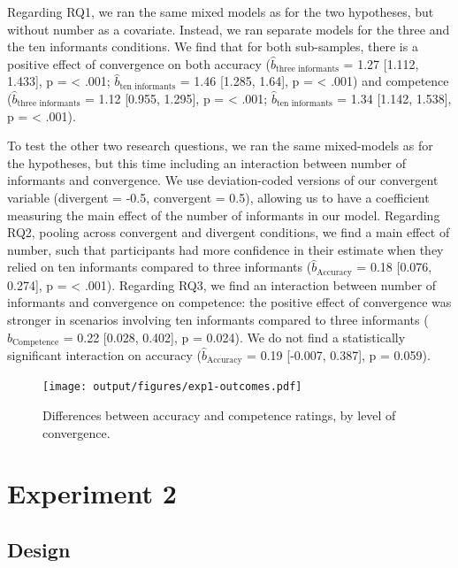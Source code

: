 \documentclass[
  doc,floatsintext]{apa6}
\begin{document}
Regarding RQ1, we ran the same mixed models as for the two hypotheses, but without number as a covariate. Instead, we ran separate models for the three and the ten informants conditions. We find that for both sub-samples, there is a positive effect of convergence on both accuracy (\(\hat{b}_{\text{three informants}}\) = 1.27 {[}1.112, 1.433{]}, p = \textless{} .001; \(\hat{b}_{\text{ten informants}}\) = 1.46 {[}1.285, 1.64{]}, p = \textless{} .001) and competence (\(\hat{b}_{\text{three informants}}\) = 1.12 {[}0.955, 1.295{]}, p = \textless{} .001; \(\hat{b}_{\text{ten informants}}\) = 1.34 {[}1.142, 1.538{]}, p = \textless{} .001).

To test the other two research questions, we ran the same mixed-models as for the hypotheses, but this time including an interaction between number of informants and convergence. We use deviation-coded versions of our convergent variable (divergent = -0.5, convergent = 0.5), allowing us to have a coefficient measuring the main effect of the number of informants in our model. Regarding RQ2, pooling across convergent and divergent conditions, we find a main effect of number, such that participants had more confidence in their estimate when they relied on ten informants compared to three informants (\(\hat{b}_{\text{Accuracy}}\) = 0.18 {[}0.076, 0.274{]}, p = \textless{} .001). Regarding RQ3, we find an interaction between number of informants and convergence on competence: the positive effect of convergence was stronger in scenarios involving ten informants compared to three informants (\(\hat{b}_{\text{Competence}}\) = 0.22 {[}0.028, 0.402{]}, p = 0.024). We do not find a statistically significant interaction on accuracy (\(\hat{b}_{\text{Accuracy}}\) = 0.19 {[}-0.007, 0.387{]}, p = 0.059).



\begin{figure}
\centering
\texttt{[image: output/figures/exp1-outcomes.pdf]}
\caption{\label{fig:exp1-outcomes}Differences between accuracy and competence ratings, by level of convergence.}
\end{figure}

\clearpage

\section{Experiment 2}\label{exp2}

\subsection{Design}\label{design-6}
\end{document}

